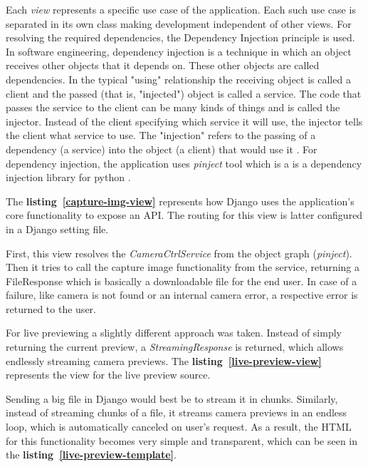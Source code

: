 Each \textit{view} represents a specific use case of the application. Each such use case is separated in its own class making development independent of other views. For resolving the required dependencies, the Dependency Injection principle is used. In software engineering, dependency injection is a technique in which an object receives other objects that it depends on. These other objects are called dependencies. In the typical "using" relationship the receiving object is called a client and the passed (that is, "injected") object is called a service. The code that passes the service to the client can be many kinds of things and is called the injector. Instead of the client specifying which service it will use, the injector tells the client what service to use. The "injection" refers to the passing of a dependency (a service) into the object (a client) that would use it \cite{di}. For dependency injection, the application uses \textit{pinject} tool which is a is a dependency injection library for python \cite{pinject}.

The \textbf{\mbox{listing \ref{capture-img-view}}} represents how Django uses the application's core functionality to expose an API. The routing for this view is latter configured in a Django setting file.



\vspace{0.3cm}
First, this view resolves the \textit{CameraCtrlService} from the object graph (\textit{pinject}). Then it tries to call the capture image functionality from the service, returning a FileResponse which is basically a downloadable file for the end user. In case of a failure, like camera is not found or an internal camera error, a respective error is returned to the user.


\vspace{0.3cm}
For live previewing a slightly different approach was taken. Instead of simply returning the current preview, a \textit{StreamingResponse} is returned, which allows endlessly streaming camera previews. The \textbf{\mbox{listing \ref{live-preview-view}}} represents the view for the live preview source.



Sending a big file in Django would best be to stream it in chunks. Similarly, instead of streaming chunks of a file, it streams camera previews in an endless loop, which is automatically canceled on user's request. As a result, the HTML for this functionality becomes very simple and transparent, which can be seen in the \textbf{\mbox{listing \ref{live-preview-template}}}.

